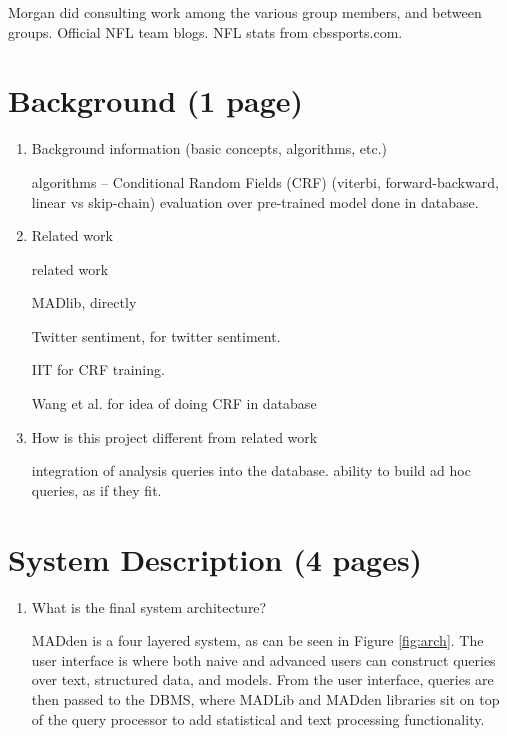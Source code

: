 \documentclass{article}
\newcommand{\system}{MADden\xspace}
\begin{document}
\begin{enumerate}
\begin{enumerate}
    Morgan did consulting work among the various group members, and between groups.
    Official NFL team blogs. NFL stats from cbssports.com.
  \end{enumerate}

  \section{Background (1 page)}
  \begin{enumerate}
  \item Background information (basic concepts, algorithms, etc.)


    algorithms -- Conditional Random Fields (CRF)
    (viterbi, forward-backward, linear vs skip-chain) evaluation over pre-trained model done in database.



  \item Related work

    related work

    MADlib, directly

    Twitter sentiment, for twitter sentiment.

    IIT for CRF training.

    Wang et al. for idea of doing CRF in database

  \item How is this project different from related work

    integration of analysis queries into the database. ability to build ad hoc queries, as if they fit.
  \end{enumerate}

  \section{System Description (4 pages)}
  \begin{enumerate}
  \item What is the final system architecture?

    {\system} is a four layered system, as can be seen in Figure \ref{fig:arch}.
    The user interface is where both naive and advanced users can construct queries over text, structured data, and models.
    From the user interface,
    queries are then passed to the DBMS,
    where MADLib and {\system} libraries sit on top of the query processor to add statistical and text processing functionality.


\end{enumerate}
\end{enumerate}
\end{document}
